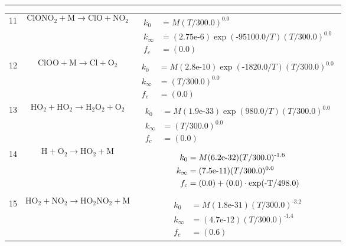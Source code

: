 \begin{longtable}{| m{} | m{}| m{} |}
$$\begin{aligned}
\end{aligned}
$$
 \\
\hline
 11 & $$ \mathrm{ClONO_2} + \mathrm{M}\longrightarrow \mathrm{ClO} + \mathrm{NO_2} $$ & $$
\begin{aligned}
    k_0 &= M(T/\textrm{300.0})^{\textrm{0.0}} \\
    k_{\infty} &= (\textrm{2.75e-6})\exp(\textrm{-95100.0}/T)(T/\textrm{300.0})^{\textrm{0.0}} \\
    f_c &= (\textrm{0.0}) 
\end{aligned}
$$
 \\
\hline
 12 & $$ \mathrm{ClOO} + \mathrm{M}\longrightarrow \mathrm{Cl} + \mathrm{O_2} $$ & $$
\begin{aligned}
    k_0 &= M(\textrm{2.8e-10})\exp(\textrm{-1820.0}/T)(T/\textrm{300.0})^{\textrm{0.0}} \\
    k_{\infty} &= (T/\textrm{300.0})^{\textrm{0.0}} \\
    f_c &= (\textrm{0.0}) 
\end{aligned}
$$
 \\
\hline
 13 & $$ \mathrm{HO_2} + \mathrm{HO_2}\longrightarrow \mathrm{H_2O_2} + \mathrm{O_2} $$ & $$
\begin{aligned}
    k_0 &= M(\textrm{1.9e-33})\exp(\textrm{980.0}/T)(T/\textrm{300.0})^{\textrm{0.0}} \\
    k_{\infty} &= (T/\textrm{300.0})^{\textrm{0.0}} \\
    f_c &= (\textrm{0.0}) 
\end{aligned}
$$
 \\
\hline
 14 & $$ \mathrm{H} + \mathrm{O_2}\longrightarrow \mathrm{HO_2} + \mathrm{M} $$ & $$
\begin{aligned}
    k_0 &= M(\textrm{6.2e-32})(T/\textrm{300.0})^{\textrm{-1.6}} \\
    k_{\infty} &= (\textrm{7.5e-11})(T/\textrm{300.0})^{\textrm{0.0}} \\
    f_c &= (\textrm{0.0}) + (\textrm{0.0})\cdot\exp(\textrm{-T/\textrm{498.0}}) 
\end{aligned}
$$
 \\
\hline
 15 & $$ \mathrm{HO_2} + \mathrm{NO_2}\longrightarrow \mathrm{HO_2NO_2} + \mathrm{M} $$ & $$
\begin{aligned}
    k_0 &= M(\textrm{1.8e-31})(T/\textrm{300.0})^{\textrm{-3.2}} \\
    k_{\infty} &= (\textrm{4.7e-12})(T/\textrm{300.0})^{\textrm{-1.4}} \\
    f_c &= (\textrm{0.6}) 
\end{aligned}
$$
\end{longtable}
